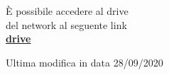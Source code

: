 \documentclass[a4paper, 11pt, oneside, article]{book} %
\begin{document}
\begin{titlepage}
	
	\vspace*{3\baselineskip} %
	
	È possibile accedere al drive \\del network al seguente link\\
	\textbf{\href{https://drive.google.com/drive/folders/0BwzuyD3iLGcbcUNxTVNOVE9FR1E}{drive}}
	
	\vspace{0.5\baselineskip} %
	
	\vspace{3\baselineskip} %
	
	
	\vfill %
	
	
	{\large Ultima modifica in data 28/09/2020} 

\end{titlepage}
\end{document}
